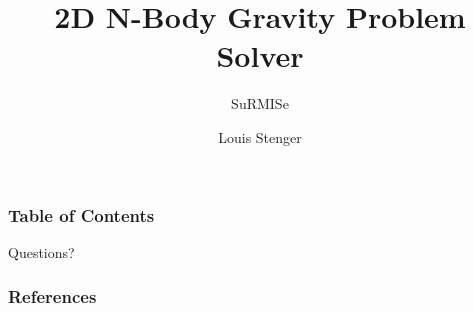 \documentclass[11pt]{beamer}
\begin{document}
	\author{Louis Stenger}
	\title{2D N-Body Gravity Problem Solver}
	\subtitle{SuRMISe}
	\date{}
	\begin{frame}
		\maketitle
	\end{frame}
	
	\begin{frame}
		\frametitle{Table of Contents}
		\tableofcontents
	\end{frame}
	
	
	
	
	\begin{frame}[standout]
		Questions?
	\end{frame}
	\begin{frame}[t,allowframebreaks]
		\frametitle{References}
		\renewcommand{\bibfont}{\normalfont\footnotesize}
		\printbibliography[heading=none]
	\end{frame}
	
\end{document}
